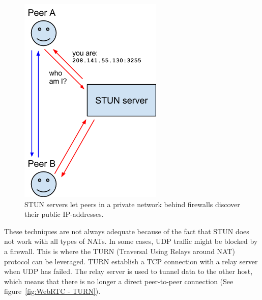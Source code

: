 \begin{figure}[htp]
\centering
\includegraphics[width=\textwidth,height=0.2\paperheight,keepaspectratio
]{figures/webrtc-stun}
\caption{STUN servers let peers in a private network behind firewalls discover their public IP-addresses\cite{WebRTCArchitecture:2014:Online}.}
\label{fig:WebRTC - STUN}
\end{figure}

These techniques are not always adequate because of the fact that STUN does not work with all types of NATs. In some cases, UDP traffic might be blocked by a firewall. This is where the TURN (Traversal Using Relays around NAT) protocol\cite{RFC5766:Online} can be leveraged.  TURN establish a TCP connection with a relay server when UDP has failed. The relay server is used to tunnel data to the other host, which means that there is no longer a direct peer-to-peer connection (See figure~\ref{fig:WebRTC - TURN}).

